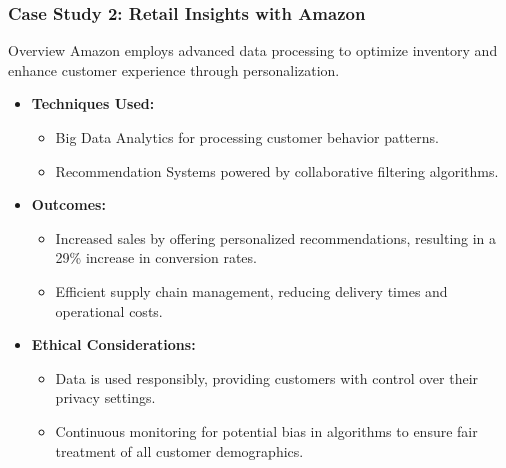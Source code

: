 \documentclass[aspectratio=169]{beamer}
\begin{document}
\begin{frame}[fragile]
    \frametitle{Case Study 2: Retail Insights with Amazon}
    \begin{block}{Overview}
        Amazon employs advanced data processing to optimize inventory and enhance customer experience through personalization.
    \end{block}
    
    \begin{itemize}
        \item \textbf{Techniques Used:}
            \begin{itemize}
                \item Big Data Analytics for processing customer behavior patterns.
                \item Recommendation Systems powered by collaborative filtering algorithms.
            \end{itemize}
        \item \textbf{Outcomes:}
            \begin{itemize}
                \item Increased sales by offering personalized recommendations, resulting in a 29\% increase in conversion rates.
                \item Efficient supply chain management, reducing delivery times and operational costs.
            \end{itemize}
        \item \textbf{Ethical Considerations:}
            \begin{itemize}
                \item Data is used responsibly, providing customers with control over their privacy settings.
                \item Continuous monitoring for potential bias in algorithms to ensure fair treatment of all customer demographics.
            \end{itemize}
    \end{itemize}
\end{frame}
\end{document}
